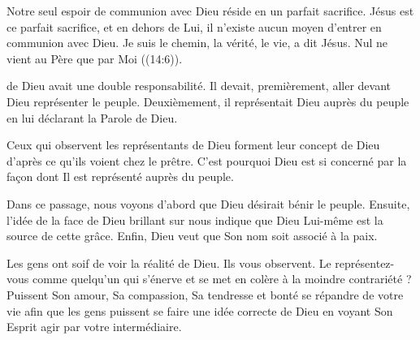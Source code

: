 Notre seul espoir de communion avec Dieu réside en un parfait sacrifice.
 Jésus est ce parfait sacrifice, et en dehors de Lui,
 il n'existe aucun moyen d'entrer en communion avec Dieu.
 \og Je suis le chemin, la vérité, le vie, \fg{} a dit Jésus.
 \og Nul ne vient au Père que par Moi \fg{} ((14:6)). 

\dvrule






 de Dieu avait une double responsabilité.
 Il devait, premièrement, aller devant Dieu représenter le peuple.
 Deuxièmement, il représentait Dieu auprès du peuple
 en lui déclarant la Parole de Dieu. 


Ceux qui observent les représentants de Dieu forment leur concept de Dieu
 d'après ce qu'ils voient chez le prêtre.
 C'est pourquoi Dieu est si concerné par la façon dont Il est représenté
 auprès du peuple. 

Dans ce passage, nous voyons d'abord que Dieu désirait bénir le peuple.
 Ensuite, l'idée de la face de Dieu brillant sur nous indique
 que Dieu Lui-même est la source de cette grâce.
 Enfin, Dieu veut que Son nom soit associé à la paix. 

Les gens ont soif de voir la réalité de Dieu. Ils vous observent.
 Le représentez-vous comme quelqu'un qui s'énerve et se met en colère
 à la moindre contrariété ? Puissent Son amour, Sa compassion,
 Sa tendresse et bonté se répandre de votre vie afin que les gens
 puissent se faire une idée correcte de Dieu en voyant
 Son Esprit agir par votre intermédiaire. 

